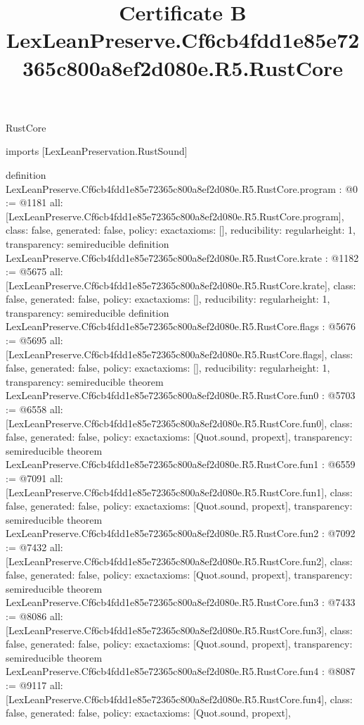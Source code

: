\begin{lexlean}{RustCore}
\title{Certificate B LexLeanPreserve.Cf6cb4fdd1e85e72365c800a8ef2d080e.R5.RustCore}
\begin{coremodule}
imports [LexLeanPreservation.RustSound]

definition LexLeanPreserve.Cf6cb4fdd1e85e72365c800a8ef2d080e.R5.RustCore.program : @0 := @1181 {
  all: [LexLeanPreserve.Cf6cb4fdd1e85e72365c800a8ef2d080e.R5.RustCore.program],
  class: false,
  generated: false,
  policy: exact{axioms: []},
  reducibility: regular{height: 1},
  transparency: semireducible
}
definition LexLeanPreserve.Cf6cb4fdd1e85e72365c800a8ef2d080e.R5.RustCore.krate : @1182 := @5675 {
  all: [LexLeanPreserve.Cf6cb4fdd1e85e72365c800a8ef2d080e.R5.RustCore.krate],
  class: false,
  generated: false,
  policy: exact{axioms: []},
  reducibility: regular{height: 1},
  transparency: semireducible
}
definition LexLeanPreserve.Cf6cb4fdd1e85e72365c800a8ef2d080e.R5.RustCore.flags : @5676 := @5695 {
  all: [LexLeanPreserve.Cf6cb4fdd1e85e72365c800a8ef2d080e.R5.RustCore.flags],
  class: false,
  generated: false,
  policy: exact{axioms: []},
  reducibility: regular{height: 1},
  transparency: semireducible
}
theorem LexLeanPreserve.Cf6cb4fdd1e85e72365c800a8ef2d080e.R5.RustCore.fun0 : @5703 := @6558 {
  all: [LexLeanPreserve.Cf6cb4fdd1e85e72365c800a8ef2d080e.R5.RustCore.fun0],
  class: false,
  generated: false,
  policy: exact{axioms: [Quot.sound, propext]},
  transparency: semireducible
}
theorem LexLeanPreserve.Cf6cb4fdd1e85e72365c800a8ef2d080e.R5.RustCore.fun1 : @6559 := @7091 {
  all: [LexLeanPreserve.Cf6cb4fdd1e85e72365c800a8ef2d080e.R5.RustCore.fun1],
  class: false,
  generated: false,
  policy: exact{axioms: [Quot.sound, propext]},
  transparency: semireducible
}
theorem LexLeanPreserve.Cf6cb4fdd1e85e72365c800a8ef2d080e.R5.RustCore.fun2 : @7092 := @7432 {
  all: [LexLeanPreserve.Cf6cb4fdd1e85e72365c800a8ef2d080e.R5.RustCore.fun2],
  class: false,
  generated: false,
  policy: exact{axioms: [Quot.sound, propext]},
  transparency: semireducible
}
theorem LexLeanPreserve.Cf6cb4fdd1e85e72365c800a8ef2d080e.R5.RustCore.fun3 : @7433 := @8086 {
  all: [LexLeanPreserve.Cf6cb4fdd1e85e72365c800a8ef2d080e.R5.RustCore.fun3],
  class: false,
  generated: false,
  policy: exact{axioms: [Quot.sound, propext]},
  transparency: semireducible
}
theorem LexLeanPreserve.Cf6cb4fdd1e85e72365c800a8ef2d080e.R5.RustCore.fun4 : @8087 := @9117 {
  all: [LexLeanPreserve.Cf6cb4fdd1e85e72365c800a8ef2d080e.R5.RustCore.fun4],
  class: false,
  generated: false,
  policy: exact{axioms: [Quot.sound, propext]},
}
\end{coremodule}
\end{lexlean}
